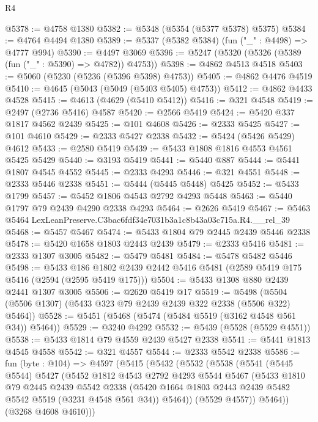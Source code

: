 \begin{lexlean}{R4}
\begin{coremodule}
@5378 := @4758 @1380
@5382 := @5348 (@5354 (@5377 @5378) @5375)
@5384 := @4764 @4494 @1380
@5389 := @5337 (@5382 @5384) (fun ("_" : @4498) => @4777 @994)
@5390 := @4497 @3069
@5396 := @5247 (@5320 (@5326 (@5389 (fun ("_" : @5390) => @4782)) @4753))
@5398 := @4862 @4513 @4518
@5403 := @5060 (@5230 (@5236 (@5396 @5398) @4753))
@5405 := @4862 @4476 @4519
@5410 := @4645 (@5043 (@5049 (@5403 @5405) @4753))
@5412 := @4862 @4433 @4528
@5415 := @4613 (@4629 (@5410 @5412))
@5416 := @321 @4548
@5419 := @2497 (@2736 @5416) @4587
@5420 := @2566 @5419
@5424 := @5420 @337 @1817 @4562 @2439
@5425 := @101 @4608
@5426 := @2333 @5425
@5427 := @101 @4610
@5429 := @2333 @5427 @2338
@5432 := @5424 (@5426 @5429) @4612
@5433 := @2580 @5419
@5439 := @5433 @1808 @1816 @4553 @4561 @5425 @5429
@5440 := @3193 @5419
@5441 := @5440 @887
@5444 := @5441 @1807 @4545 @4552
@5445 := @2333 @4293
@5446 := @321 @4551
@5448 := @2333 @5446 @2338
@5451 := @5444 (@5445 @5448) @5425
@5452 := @5433 @1799
@5457 := @5452 @1806 @4543 @2792 @4293 @5448
@5463 := @5440 @1797 @79 @2439 @4290 @2338 @4293
@5464 := @2626 @5419
@5467 := @5463 @5464 LexLeanPreserve.C3bac6fdf34e7031b3a1c8b43a03c715a.R4.__rel_39
@5468 := @5457 @5467
@5474 := @5433 @1804 @79 @2445 @2439 @5446 @2338
@5478 := @5420 @1658 @1803 @2443 @2439
@5479 := @2333 @5416
@5481 := @2333 @1307 @3005
@5482 := @5479 @5481
@5484 := @5478 @5482 @5446
@5498 := @5433
    @186
    @1802
    @2439
    @2442
    @5416
    @5481
    (@2589 @5419 @175 @5416 (@2594 (@2595 @5419 @175)))
@5504 := @5433 @1308 @880 @2439 @2441 @1307 @3005
@5506 := @2620 @5419 @17
@5519 := @5498 (@5504 (@5506 @1307) (@5433 @323 @79 @2439 @2439 @322 @2338 (@5506 @322) @5464))
@5528 := @5451 (@5468 (@5474 (@5484 @5519 (@3162 @4548 @561 @34)) @5464))
@5529 := @3240 @4292
@5532 := @5439 (@5528 (@5529 @4551))
@5538 := @5433 @1814 @79 @4559 @2439 @5427 @2338
@5541 := @5441 @1813 @4545 @4558
@5542 := @321 @4557
@5544 := @2333 @5542 @2338
@5586 := fun (byte : @104) =>
  @4597
    (@5415
      (@5432
        (@5532
          (@5538
            (@5541
              (@5445 @5544)
              @5427
              (@5452
                @1812
                @4543
                @2792
                @4293
                @5544
                @5467
                (@5433
                  @1810
                  @79
                  @2445
                  @2439
                  @5542
                  @2338
                  (@5420 @1664 @1803 @2443 @2439 @5482 @5542 @5519 (@3231 @4548 @561 @34))
                  @5464))
              (@5529 @4557))
            @5464))
        (@3268 @4608 @4610)))

\end{coremodule}
\end{lexlean}
